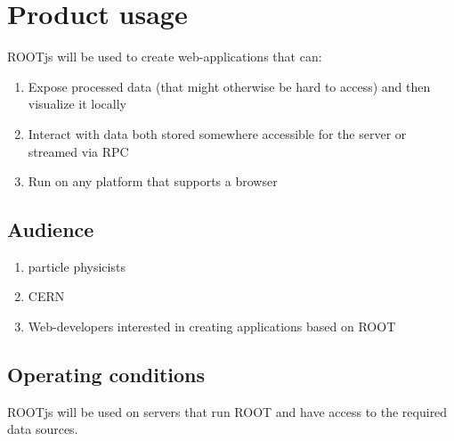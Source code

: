 \chapter{Product usage}

ROOTjs will be used to create web-applications that can:
\begin{enumerate}
	\item Expose processed data (that might otherwise be hard to access) and then visualize it locally
	\item Interact with data both stored somewhere accessible for the server or streamed via RPC
	\item Run on any platform that supports a browser
\end{enumerate}


\section{Audience}
\begin{enumerate}
	\item particle physicists
	\item CERN
	\item Web-developers interested in creating applications based on ROOT
\end{enumerate}

\section{Operating conditions}

ROOTjs will be used on servers that run ROOT and have access to the required data sources.
